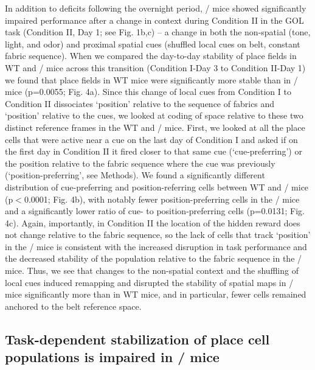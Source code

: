 In addition to deficits following the overnight period, \df/ mice showed significantly impaired performance after a change in context during Condition II in the GOL task (Condition II, Day 1; see Fig. 1b,c) – a change in both the non-spatial (tone, light, and odor) and proximal spatial cues (shuffled local cues on belt, constant fabric sequence). When we compared the day-to-day stability of place fields in WT and \df/ mice across this transition (Condition I-Day 3 to Condition II-Day 1) we found that place fields in WT mice were significantly more stable than in \df/ mice (p=0.0055; Fig. 4a). Since this change of local cues from Condition I to Condition II dissociates ‘position’ relative to the sequence of fabrics and ‘position’ relative to the cues, we looked at coding of space relative to these two distinct reference frames in the WT and \df/ mice. First, we looked at all the place cells that were active near a cue on the last day of Condition I and asked if on the first day in Condition II it fired closer to that same cue (‘cue-preferring’) or the position relative to the fabric sequence where the cue was previously (‘position-preferring’, see Methods). We found a significantly different distribution of cue-preferring and position-referring cells between WT and \df/ mice (p$<$0.0001; Fig. 4b), with notably fewer position-preferring cells in the \df/ mice and a significantly lower ratio of cue- to position-preferring cells (p=0.0131; Fig. 4c). Again, importantly, in Condition II the location of the hidden reward does not change relative to the fabric sequence, so the lack of cells that track ‘position’ in the \df/ mice is consistent with the increased disruption in task performance and the decreased stability of the population relative to the fabric sequence in the \df/ mice. Thus, we see that changes to the non-spatial context and the shuffling of local cues induced remapping and disrupted the stability of spatial maps in \df/ mice significantly more than in WT mice, and in particular, fewer cells remained anchored to the belt reference space.

\subsection{Task-dependent stabilization of place cell populations is impaired in \df/ mice}

